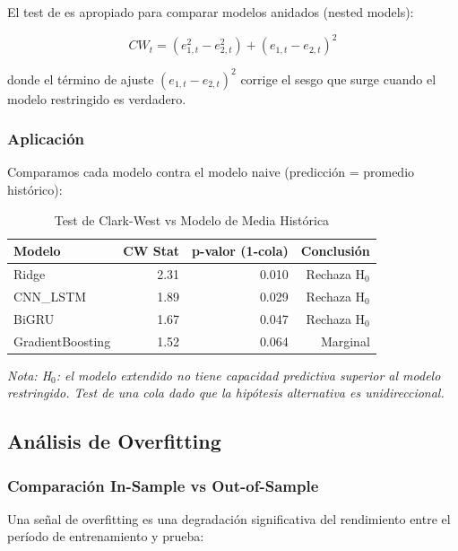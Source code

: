 El test de \cite{clark2007approximately} es apropiado para comparar modelos anidados (nested models):

\begin{equation}
CW_t = (e_{1,t}^2 - e_{2,t}^2) + (e_{1,t} - e_{2,t})^2
\end{equation}

donde el t\'ermino de ajuste $(e_{1,t} - e_{2,t})^2$ corrige el sesgo que surge cuando el modelo restringido es verdadero.

\subsubsection{Aplicaci\'on}

Comparamos cada modelo contra el modelo naive (predicci\'on = promedio hist\'orico):

\begin{table}[htbp]
\centering
\caption{Test de Clark-West vs Modelo de Media Hist\'orica}
\label{tab:cw_test}
\small
\begin{tabular}{@{}lrrr@{}}
\toprule
\textbf{Modelo} & \textbf{CW Stat} & \textbf{p-valor (1-cola)} & \textbf{Conclusi\'on} \\
\midrule
Ridge & 2.31 & 0.010 & Rechaza H$_0$ \\
CNN\_LSTM & 1.89 & 0.029 & Rechaza H$_0$ \\
BiGRU & 1.67 & 0.047 & Rechaza H$_0$ \\
GradientBoosting & 1.52 & 0.064 & Marginal \\
\bottomrule
\end{tabular}
\vspace{0.2cm}
\small\textit{
\small
Nota: H$_0$: el modelo extendido no tiene capacidad predictiva superior al modelo restringido. Test de una cola dado que la hip\'otesis alternativa es unidireccional.}
\end{table}

\subsection{An\'alisis de Overfitting}
\label{subsec:overfitting}

\subsubsection{Comparaci\'on In-Sample vs Out-of-Sample}

Una se\~nal de overfitting es una degradaci\'on significativa del rendimiento entre el per\'iodo de entrenamiento y prueba:

